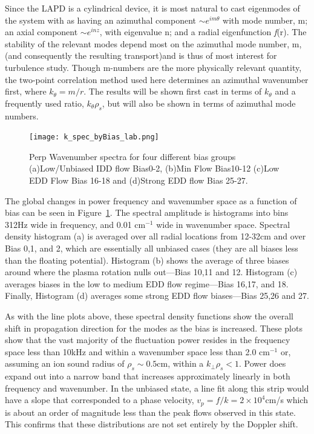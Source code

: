 \documentclass[aip,pop,amsmath,amssymb,reprint,superscriptaddress]{revtex4-1} %
\begin{document}
Since the LAPD is a cylindrical device, it is most natural to cast eigenmodes of the system with as having an azimuthal component $\sim e^{im \theta}$ with mode number, m; an axial component $\sim e^{inz}$, with eigenvalue n; and a radial eigenfunction \textit{f}(r). The stability of the relevant modes depend most on the azimuthal mode number, m, (and consequently the resulting transport)and is thus of most interest for turbulence study. Though m-numbers are the more physically relevant quantity, the two-point correlation method used here determines an azimuthal wavenumber first, where $k_{\theta} = m/r$. The results will be shown first cast in terms of $k_{\theta}$ and a frequently used ratio, $k_{\theta}\rho_{s}$, but will also be shown in terms of azimuthal mode numbers.

\begin{figure}[!htbp]
\centerline{
\texttt{[image: k\_spec\_byBias\_lab.png]}}
\caption{\label{fig:k_spec_byBias_lab} Perp Wavenumber spectra for four  different bias groups (a)Low/Unbiased IDD flow Bias0-2, (b)Min Flow Bias10-12 (c)Low EDD Flow Bias 16-18 and (d)Strong EDD flow Bias 25-27.}
\end{figure}

The global changes in power frequency and wavenumber space as a function of bias can be seen in Figure~\ref{fig:k_spec_byBias_lab}. The spectral amplitude is histograms into bins 312Hz wide in frequency, and 0.01 $\text{cm}^{-1}$ wide in wavenumber space. Spectral density histogram (a) is averaged over all radial locations from 12-32cm and over Bias 0,1, and 2, which are essentially all unbiased cases (they are all biases less than the floating potential). Histogram (b) shows the average of three biases around where the plasma rotation nulls out---Bias 10,11 and 12. Histogram (c) averages biases in the low to medium EDD flow regime---Bias 16,17, and 18. Finally, Histogram (d) averages some strong EDD flow biases---Bias 25,26 and 27. 

As with the line plots above, these spectral density functions show the overall shift in propagation direction for the modes as the bias is increased. These plots show that the vast majority of the fluctuation power resides in the frequency space less than 10kHz and within a wavenumber space less than 2.0 $\text{cm}^{-1}$ or, assuming an ion sound radius of $\rho_{s} \sim 0.5$cm, within a $k_{\perp}\rho_{s} < 1$. Power does expand out into a narrow band that increases approximately linearly in both frequency and wavenumber. In the unbiased state, a line fit along this strip would have a slope that corresponded to a phase velocity, $v_{p} = f/k = 2 \times 10^{4} $cm/s which is about an order of magnitude less than the peak flows observed in this state. This confirms that these distributions are not set entirely by the Doppler shift.
\end{document}
